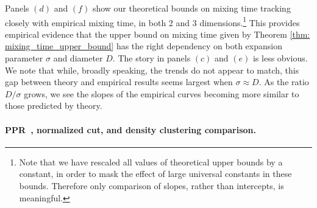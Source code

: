 \documentclass{article}
\newcommand{\1}{\mathbf{1}}
\newcommand{\pprspace}{{\sc PPR~}}
\theoremstyle{aldenthm}
\theoremstyle{aldenrmrk}
\begin{document}
Panels $(d)$ and $(f)$ show our theoretical bounds on mixing time tracking closely with empirical mixing time, in both 2 and 3 dimensions.\footnote{Note that we have rescaled all values of theoretical upper bounds by a constant, in order to mask the effect of large universal constants in these bounds. Therefore only comparison of slopes, rather than intercepts, is meaningful.} This provides empirical evidence that the upper bound on mixing time given by Theorem \ref{thm: mixing_time_upper_bound} has the right dependency on both expansion parameter $\sigma$ and diameter $D$. The story in panels $(c)$ and $(e)$ is less obvious. We note that while, broadly speaking, the trends do not appear to match, this gap between theory and empirical results seems largest when $\sigma \approx D$. As the ratio $D/\sigma$ grows, we see the slopes of the empirical curves becoming more similar to those predicted by theory.

\paragraph{\pprspace, normalized cut, and density clustering comparison.}
\end{document}
